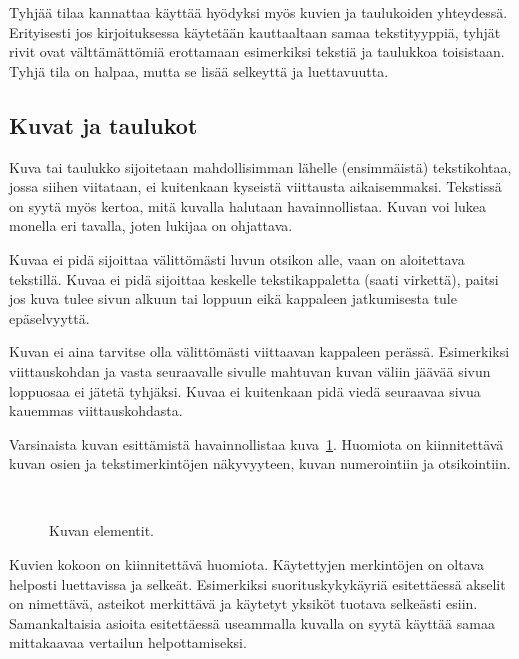 \documentclass[finnish,gradu]{tktltiki}
\begin{document}
 Tyhjää tilaa kannattaa käyttää hyödyksi myös kuvien ja taulukoiden
yhteydessä. Erityisesti jos kirjoituksessa käytetään kauttaaltaan samaa
tekstityyppiä, tyhjät rivit ovat välttämättömiä erottamaan esimerkiksi
tekstiä ja taulukkoa toisistaan. Tyhjä tila on halpaa, mutta se lisää
selkeyttä ja luettavuutta.
 
 

\enlargethispage{5mm}
\subsection{Kuvat ja taulukot}


Kuva tai taulukko sijoitetaan mahdollisimman lähelle
(ensimmäistä) tekstikohtaa, jossa siihen viitataan, ei kuitenkaan
kyseistä viittausta aikaisemmaksi.
Tekstissä on syytä myös kertoa, mitä kuvalla halutaan havainnollistaa.
Kuvan voi lukea monella eri tavalla, joten lukijaa on ohjattava.

Kuvaa ei pidä sijoittaa välittömästi luvun otsikon alle, vaan on
aloitettava tekstillä. Kuvaa ei pidä sijoittaa keskelle tekstikappaletta
(saati virkettä), paitsi jos kuva tulee sivun alkuun tai loppuun eikä
kappaleen jatkumisesta tule epäselvyyttä.

Kuvan ei aina tarvitse olla välittömästi viittaavan kappaleen
perässä. Esimerkiksi viittauskohdan ja
vasta seuraavalle sivulle mahtuvan kuvan väliin jäävää sivun loppuosaa
ei jätetä tyhjäksi. Kuvaa ei kuitenkaan pidä viedä seuraavaa
sivua kauemmas viittauskohdasta.


Varsinaista kuvan esittämistä havainnollistaa kuva~\ref{kuvaesimerkki}.
Huomiota on kiinnitettävä kuvan osien ja tekstimerkintöjen näkyvyyteen,
kuvan numerointiin ja otsikointiin. 

\begin{figure}[h]
\ \newline
\begin{center}
\caption{Kuvan elementit.}
\label{kuvaesimerkki}
\end{center}
\end{figure}


Kuvien kokoon on kiinnitettävä huomiota. Käytettyjen merkintöjen
on oltava helposti luettavissa ja selkeät. Esimerkiksi
suorituskykykäyriä esitettäessä akselit on nimettävä, asteikot
merkittävä ja käytetyt yksiköt tuotava selkeästi esiin.
Samankaltaisia asioita esitettäessä useammalla kuvalla on
syytä käyttää samaa mittakaavaa vertailun helpottamiseksi.
\end{document}
